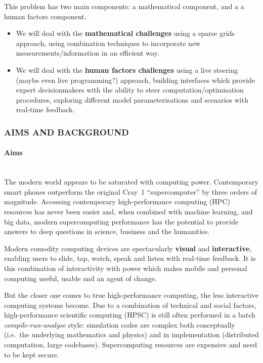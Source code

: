 \documentclass[a4paper,fontsize=12pt]{scrartcl}
\begin{document}
This problem has two main components: a mathematical component, and a
a human factors component.
\begin{itemize}
\item We will deal with the \textbf{mathematical challenges} using a
  sparse grids approach, using combination techniques
  to incorporate new measurements/information in an efficient way.
\item We will deal with the \textbf{human factors challenges} using a
  live steering (maybe even live programming?) approach, building
  interfaces which provide expert decisionmakers with the ability to
  steer computation/optimisation procedures, exploring different model
  parameterisations and scenarios with real-time feedback.
\end{itemize}

\subsubsection*{AIMS AND BACKGROUND}

\paragraph*{Aims}\mbox{}\\

The modern world appears to be saturated with computing power.
Contemporary smart phones outperform the original Cray~1
``supercomputer'' by three orders of magnitude. Accessing contemporary
high-performance computing (HPC) resources has never been easier and,
when combined with machine learning\cite{Hastie2009}, and big
data\cite{Manyika2011}, modern supercomputing performance has the
potential to provide answers to deep questions in science, business
and the humanities.

Modern comodity computing devices are spectacularly \textbf{visual}
and \textbf{interactive}, enabling users to slide, tap, watch, speak
and listen with real-time feedback. It is this combination of
interactivity with power which makes mobile and personal computing
useful, usable and an agent of change.

But the closer one comes to true high-performance computing, the less
interactive computing systems become. Due to a combination of
technical and social factors, high-performance scientific computing
(HPSC) is still often performed in a batch \emph{compile-run-analyse}
style: simulation codes are complex both conceptually (i.e.~the
underlying mathematics and physics) and in implementation (distributed
computation, large codebases). Supercomputing resources are expensive
and need to be kept secure.
\end{document}
